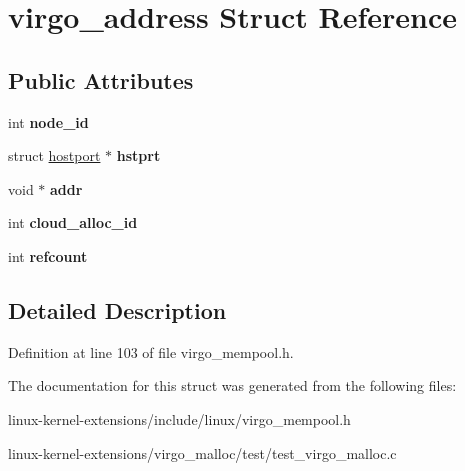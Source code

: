 \hypertarget{structvirgo__address}{\section{virgo\-\_\-address Struct Reference}
\label{structvirgo__address}
}
\subsection*{Public Attributes}
\begin{DoxyCompactItemize}
\item 
\hypertarget{structvirgo__address_a0f3ffa109b16d9d8af01b03efe43824b}{int {\bfseries node\-\_\-id}}\label{structvirgo__address_a0f3ffa109b16d9d8af01b03efe43824b}

\item 
\hypertarget{structvirgo__address_ae1989c9f690a055a54955f413f2f63d0}{struct \hyperlink{structhostport}{hostport} $\ast$ {\bfseries hstprt}}\label{structvirgo__address_ae1989c9f690a055a54955f413f2f63d0}

\item 
\hypertarget{structvirgo__address_a78c2a6228e0ea8e4844aa3cc6aa88083}{void $\ast$ {\bfseries addr}}\label{structvirgo__address_a78c2a6228e0ea8e4844aa3cc6aa88083}

\item 
\hypertarget{structvirgo__address_a208438f22b79493029c7015eadd9865b}{int {\bfseries cloud\-\_\-alloc\-\_\-id}}\label{structvirgo__address_a208438f22b79493029c7015eadd9865b}

\item 
\hypertarget{structvirgo__address_aab932df1dd2654a7e790c8dfd37412c9}{int {\bfseries refcount}}\label{structvirgo__address_aab932df1dd2654a7e790c8dfd37412c9}

\end{DoxyCompactItemize}


\subsection{Detailed Description}


Definition at line 103 of file virgo\-\_\-mempool.\-h.



The documentation for this struct was generated from the following files\-:\begin{DoxyCompactItemize}
\item 
linux-\/kernel-\/extensions/include/linux/virgo\-\_\-mempool.\-h\item 
linux-\/kernel-\/extensions/virgo\-\_\-malloc/test/test\-\_\-virgo\-\_\-malloc.\-c\end{DoxyCompactItemize}
